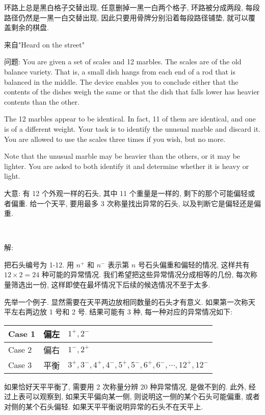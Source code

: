 环路上总是黑白格子交替出现, 任意删掉一黑一白两个格子, 环路被分成两段, 每段路径仍然是一黑一白交替出现, 因此只要用骨牌分别沿着每段路径铺垫, 就可以覆盖剩余的棋盘.


\newpage
\noindent 来自"Heard on the street"

\noindent 问题: You are given a set of scales and 12 marbles. The scales are of the old balance variety. That is, a small dish hangs from each end of a rod that is balanced in the middle. The device enables you to conclude either that the contents of the dishes weigh the same or that the dish that falls lower has heavier contents than the other.

The 12 marbles appear to be identical. In fact, 11 of them are identical, and one is of a different weight. Your task is to identify the unusual marble and discard it. You are allowed to use the scales three times if you wish, but no more.

Note that the unusual marble may be heavier than the others, or it may be lighter. You are asked to both identify it and determine whether it is heavy or light.

大意: 有 12 个外观一样的石头, 其中 11 个重量是一样的, 剩下的那个可能偏轻或者偏重. 给一个天平, 要用最多 3 次称量找出异常的石头, 以及判断它是偏轻还是偏重. 

~ 

\noindent 解:

把石头编号为 1-12. 用 $ n^+ $ 和 $ n^- $ 表示第 $ n $ 号石头偏重和偏轻的情况, 这样共有 $ 12\times 2 = 24 $ 种可能的异常情况. 我们希望把这些异常情况分成相等的几份, 每次称量筛选出一份, 这样即使在最坏情况下后续的候选情况不至于太多. 

先举一个例子. 显然需要在天平两边放相同数量的石头才有意义. 如果第一次称天平左右两边放 1 号和 2 号. 结果可能有 3 种, 每一种对应的异常情况如下:
\begin{figure*}[htbp]
\centering
\setlength\extrarowheight{2pt}
\begin{tabular}{l|l|l}
\hline
Case 1 & 偏左  & $1^+, 2^-$ \\ \hline
Case 2 & 偏右  & $1^-, 2^+$ \\ \hline
Case 3 & 平衡  & $3^+, 3^-, 4^+, 4^-, 5^+, 5^-, 6^+, 6^-, \cdots, 12^+, 12^- $ \\ \hline
\end{tabular}
\end{figure*}

如果恰好天平平衡了, 需要用 2 次称量分辨 20 种异常情况, 是做不到的. 此外, 经过上表可以观察到, 如果天平偏向某一侧, 则说明这一侧的某个石头可能偏重, 或者对侧的某个石头偏轻. 如果天平平衡说明异常的石头不在天平上. 

